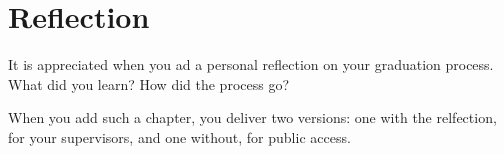 \chapter{Reflection}
It is appreciated when you ad a personal reflection on your graduation process. What did you learn? How did the process go?

When you add such a chapter, you deliver two versions: one with the relfection, for your supervisors, and one without, for public access.